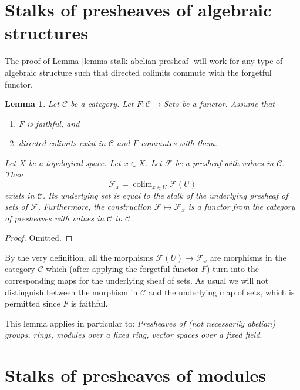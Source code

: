 \documentclass{stacks-project}
\theoremstyle{plain}
\newtheorem{lemma}[subsection]{Lemma}
\theoremstyle{definition}
\theoremstyle{remark}
\numberwithin{equation}{subsection}
\def\colim{\mathop{\mathrm{colim}}\nolimits}
\begin{document}
\section{Stalks of presheaves of algebraic structures}
\label{section-stalks-presheaves-structures}

\noindent
The proof of Lemma \ref{lemma-stalk-abelian-presheaf} will work
for any type of algebraic structure such that directed
colimits commute with the forgetful functor.

\begin{lemma}
\label{lemma-stalk-presheaf-values-in-category}
Let $\mathcal{C}$ be a category. Let $F : \mathcal{C} \to \textit{Sets}$
be a functor. Assume that
\begin{enumerate}
\item $F$ is faithful, and
\item directed colimits exist in $\mathcal{C}$ and $F$ commutes with
them.
\end{enumerate}
Let $X$ be a topological space. Let $x \in X$. Let $\mathcal{F}$
be a presheaf with values in $\mathcal{C}$.
Then
$$
\mathcal{F}_x = \colim_{x\in U} \mathcal{F}(U)
$$
exists in $\mathcal{C}$. Its underlying set is equal to the
stalk of the underlying presheaf of sets of $\mathcal{F}$.
Furthermore, the construction $\mathcal{F} \mapsto \mathcal{F}_x$
is a functor from the category of presheaves with values in
$\mathcal{C}$ to $\mathcal{C}$.
\end{lemma}

\begin{proof}
Omitted.
\end{proof}

\noindent
By the very definition, all the morphisms $\mathcal{F}(U)
\to \mathcal{F}_x$ are morphisms in the category $\mathcal{C}$
which (after applying the forgetful functor $F$) turn into
the corresponding maps for the underlying sheaf of sets.
As usual we will not distinguish between the morphism
in $\mathcal{C}$ and the underlying map of sets, which
is permitted since $F$ is faithful.

\medskip\noindent
This lemma applies in particular to:
{\it Presheaves of (not necessarily abelian) groups, rings, modules
over a fixed ring, vector spaces over a fixed field}.

\section{Stalks of presheaves of modules}
\label{section-stalk-presheaves-modules}
\end{document}
